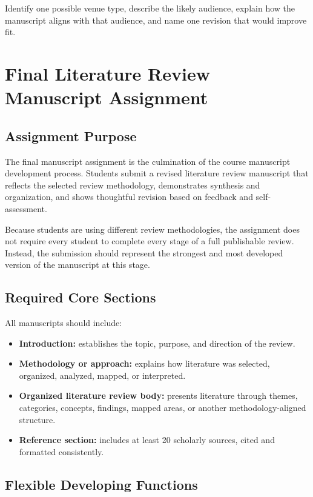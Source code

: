 \documentclass[11pt]{article}
\begin{document}
Identify one possible venue type, describe the likely audience, explain how the manuscript aligns with that audience, and name one revision that would improve fit.

\section{Final Literature Review Manuscript Assignment}

\subsection{Assignment Purpose}

The final manuscript assignment is the culmination of the course manuscript development process. Students submit a revised literature review manuscript that reflects the selected review methodology, demonstrates synthesis and organization, and shows thoughtful revision based on feedback and self-assessment.

Because students are using different review methodologies, the assignment does not require every student to complete every stage of a full publishable review. Instead, the submission should represent the strongest and most developed version of the manuscript at this stage.

\subsection{Required Core Sections}

All manuscripts should include:

\begin{itemize}
  \item \textbf{Introduction:} establishes the topic, purpose, and direction of the review.
  \item \textbf{Methodology or approach:} explains how literature was selected, organized, analyzed, mapped, or interpreted.
  \item \textbf{Organized literature review body:} presents literature through themes, categories, concepts, findings, mapped areas, or another methodology-aligned structure.
  \item \textbf{Reference section:} includes at least 20 scholarly sources, cited and formatted consistently.
\end{itemize}

\subsection{Flexible Developing Functions}
\end{document}
